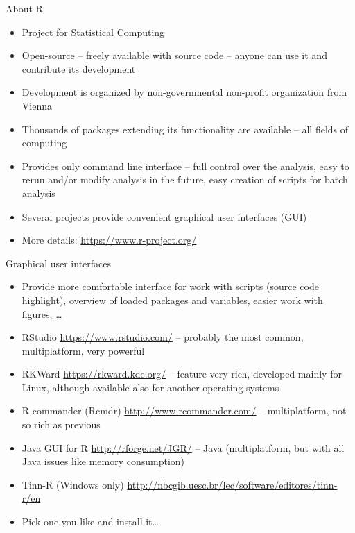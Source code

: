 \documentclass[compress, ucs, xelatex, 11pt, xcolor=svgnames,
  hyperref={
    bookmarks=true,
    unicode=true,
    colorlinks=true,
    pdftitle={Molecular data in R},
    plainpages=false,
    pdfauthor={Vojtech Zeisek},
    pdfsubject={Course about phylogeny and evolution in R},
    pdfcreator={XeLaTeX},
    pdfkeywords={R, evolution, phylogeny, molecular data},
    linkcolor=Tomato,
    anchorcolor=SaddleBrown,
    citecolor=Goldenrod,
    filecolor=DarkMagenta,
    menucolor=Sienna,
    urlcolor=DarkTurquoise,
    pdftex},
  url={hyphens, lowtilde} %
  ]{beamer}
\begin{document}
\begin{frame}{About R}
\begin{itemize}
 \item Project for Statistical Computing
 \item Open-source -- freely available with source code -- anyone can use it and contribute its development
 \item Development is organized by non-governmental non-profit organization from Vienna
 \item Thousands of packages extending its functionality are available -- all fields of computing
 \item Provides only command line interface -- full control over the analysis, easy to rerun and/or modify analysis in the future, easy creation of scripts for batch analysis
 \item Several projects provide convenient graphical user interfaces (GUI)
 \item More details: \url{https://www.r-project.org/}
\end{itemize}
\end{frame}

\begin{frame}{Graphical user interfaces}
\begin{itemize}
 \item Provide more comfortable interface for work with scripts (source code highlight), overview of loaded packages and variables, easier work with figures, \ldots
 \item RStudio \url{https://www.rstudio.com/} -- probably the most common, multiplatform, very powerful
 \item RKWard \url{https://rkward.kde.org/} -- feature very rich, developed mainly for Linux, although available also for another operating systems
 \item R commander (Rcmdr) \url{http://www.rcommander.com/} -- multiplatform, not so rich as previous
 \item Java GUI for R \url{http://rforge.net/JGR/} -- Java (multiplatform, but with all Java issues like memory consumption)
 \item Tinn-R (Windows only) \url{http://nbcgib.uesc.br/lec/software/editores/tinn-r/en}
 \item Pick one you like and install it\ldots
\end{itemize}
\end{frame}
\end{document}
